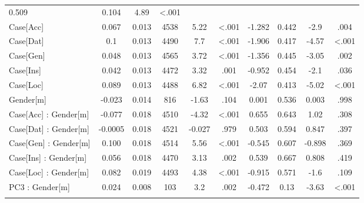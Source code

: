 \documentclass[output=paper, modfonts,newtxmath,hidelinks]{langscibook}
\begin{document}
\begin{sidewaystable}
\begin{tabularx}{\textwidth}{l SS S[table-format=4.0] *{6}{S}}
     0.509 & 0.104 &4.89 &<.001\\ 
 Case[Acc] & 0.067 & 0.013 & 4538 & 5.22 & <.001 &
        -1.282 & 0.442 &-2.9 &.004\\
 Case[Dat] & 0.1  & 0.013 & 4490 & 7.7  & <.001 &
     -1.906 & 0.417 &-4.57 &<.001\\
 Case[Gen] & 0.048 & 0.013 & 4565 & 3.72 & <.001 &
     -1.356 & 0.445 &-3.05 &.002\\
 Case[Ins] & 0.042 & 0.013 & 4472 & 3.32 & .001  &
     -0.952 & 0.454 &-2.1 &.036\\
 Case[Loc] & 0.089 & 0.013 & 4488 & 6.82 & <.001 &
     -2.07 & 0.413 &-5.02 &<.001\\
 Gender[m] & -0.023 & 0.014 & 816  & -1.63 & .104  &
     0.001 & 0.536 &0.003 &.998\\
 Case[Acc] : Gender[m] & -0.077 & 0.018 & 4510 & -4.32 & <.001 &
              0.655  & 0.643 &1.02 &.308\\
 Case[Dat] : Gender[m] & -0.0005 & 0.018 & 4521 & -0.027 & .979 &
        0.503 & 0.594 &0.847 &.397\\
 Case[Gen] : Gender[m] & 0.100  & 0.018 & 4514 & 5.56  & <.001 &
        -0.545 & 0.607 &-0.898 &.369\\
 Case[Ins] : Gender[m] & 0.056 & 0.018 & 4470 & 3.13  & .002 &
        0.539 & 0.667 &0.808 &.419\\ 
 Case[Loc] : Gender[m] & 0.082  & 0.019 & 4493 & 4.38  & <.001 &
       -0.915 & 0.571 &-1.6 &.109\\
 PC3 : Gender[m]   & 0.024  & 0.008 & 103  & 3.2   & .002 &
        -0.472 & 0.13 &-3.63 &<.001\\
   \lspbottomrule
 \end{tabularx}    
\end{sidewaystable}
\end{document}
